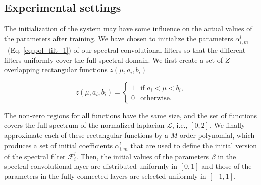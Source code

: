 \documentclass[10pt,journal,compsoc]{IEEEtran}
\begin{document}
\begin{table*}[!ht]
{			%
		}
		\label{tab:arch_part2}
	\end{table*}
	
	\subsection{Experimental settings}
	\label{s:init}
	
	The initialization of the system may have some influence on the actual values of the parameters after training. We have chosen to initialize the parameters $\alpha_{i,m}^l$~(Eq. \ref{eq:pol_filt_1}) of our spectral convolutional filters so that the different filters uniformly cover the full spectral domain. We first create a set of $Z$ overlapping rectangular functions $z(\mu, a_i, b_i)$
	
	\begin{equation}
	z(\mu, a_i, b_i) = 
	\begin{cases} 
	1 & \mbox{if } a_i < \mu < b_i, \\ 
	0 & \mbox{otherwise.}
	\end{cases}
	\end{equation}
	
	The non-zero regions for all functions have the same size, and the set of functions covers the full spectrum of the normalized laplacian $\mathcal{L}$, i.e., $[0, 2]$. We finally approximate each of these rectangular functions by a $M$-order polynomial, which produces a set of initial coefficients $\alpha_{i,m}^l$ that are used to define the initial version of the spectral filter $\mathcal{F}_i^{l}$. Then, the initial values of the parameters $\beta$ in the spectral convolutional layer are distributed uniformly in $[0, 1]$ and those of the parameters in the fully-connected layers are selected uniformly in $[-1, 1]$. 
	
\end{document}
